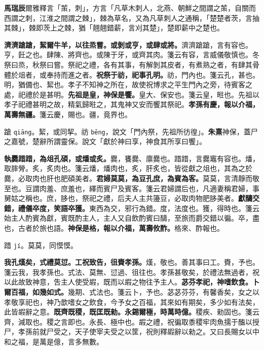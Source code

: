 \begin{quoting}\textbf{馬瑞辰}爾雅釋言「茦，刺」，方言「凡草木刺人，北燕、朝鮮之間謂之茦，自關而西謂之刺，江淮之間謂之棘」，棘為草名，又為凡草刺人之通稱，「楚楚者茨，言抽其棘」，棘即茨上之棘，猶「翹翹錯薪，言刈其楚」，楚即薪中之楚也。\end{quoting}

\textbf{濟濟蹌蹌，絜爾牛羊，以往烝嘗。或剝或亨，或肆或將。}{\footnotesize 濟濟蹌蹌，言有容也。亨，飪之也。肆陳、將齊也。或陳于牙，或齊其肉。箋云有容，言威儀敬慎也。冬祭曰烝，秋祭曰嘗。祭祀之禮，各有其事，有解剝其皮者，有煮熟之者，有肆其骨體於俎者，或奉持而進之者。}\textbf{祝祭于祊，祀事孔明。}{\footnotesize 祊，門內也。箋云孔，甚也。明，猶備也、絜也。孝子不知神之所在，故使祝博求之平生門內之旁，待賓客之處，祀禮於是甚明。}\textbf{先祖是皇，神保是饗。}{\footnotesize 皇大、保安也。箋云皇，暀也。先祖以孝子祀禮甚明之故，精氣歸暀之，其鬼神又安而饗其祭祀。}\textbf{孝孫有慶，報以介福，萬壽無疆。}{\footnotesize 箋云慶，賜也。疆，竟界也。}

\begin{quoting}蹌 \texttt{qiāng}。絜，或同挈。祊 \texttt{bēng}，說文「門內祭，先祖所彷徨」。\textbf{朱熹}神保，蓋尸之嘉號，楚辭所謂靈保。說文「獻於神曰享，神食其所享曰饗」。\end{quoting}

\textbf{執爨踖踖，為俎孔碩，或燔或炙。}{\footnotesize 爨，饔爨、廪爨也。踖踖，言爨竈有容也。燔，取膟膋。炙，炙肉也。箋云燔，燔肉也，炙，肝炙也，皆從獻之俎也，其為之於爨，必取肉也肝也肥碩美者。}\textbf{君婦莫莫，為豆孔庶，為賓為客。}{\footnotesize 莫莫，言清靜而敬至也。豆謂肉羞、庶羞也，繹而賓尸及賓客。箋云君婦謂后也，凡適妻稱君婦，事舅姑之稱也。庶，䏧也，祭祀之禮，后夫人主共籩豆，必取肉物肥䏧美者。}\textbf{獻醻交錯，禮儀卒度，笑語卒獲。}{\footnotesize 東西為交，邪行為錯。度，法度也。獲，得時也。箋云始主人酌賓為獻，賓既酌主人，主人又自飲酌賓曰醻，至旅而爵交錯以徧。卒，盡也，古者於旅也語。}\textbf{神保是格，報以介福，萬壽攸酢。}{\footnotesize 格來、酢報也。}

\begin{quoting}踖 \texttt{jí}。莫莫，同慔慔。\end{quoting}

\textbf{我孔熯矣，式禮莫愆。工祝致告，徂賚孝孫。}{\footnotesize 熯，敬也。善其事曰工。賚，予也。箋云我，我孝孫也。式法、莫無、愆過、徂往也。孝孫甚敬矣，於禮法無過者，祝以此故致神意，吿主人使受嘏，既而以嘏之物往予主人。}\textbf{苾芬孝祀，神嗜飲食。卜爾百福，如幾如式。}{\footnotesize 幾期、式法也。箋云卜，予也。苾苾芬芬，有馨香矣，女之以孝敬享祀也，神乃歆嗜女之飲食，今予女之百福，其來如有期矣，多少如有法矣，此皆嘏辭之意。}\textbf{既齊既稷，既匡既勑。永錫爾極，時萬時億。}{\footnotesize 稷疾、勑固也。箋云齊，減取也。稷之言即也。永長、極中也。嘏之禮，祝徧取黍稷牢肉魚擩于醢以授尸，孝孫前就尸受之，天子使宰夫受之以筐，祝則釋嘏辭以勑之。又曰長賜女以中和之福，是萬是億，言多無數。}

